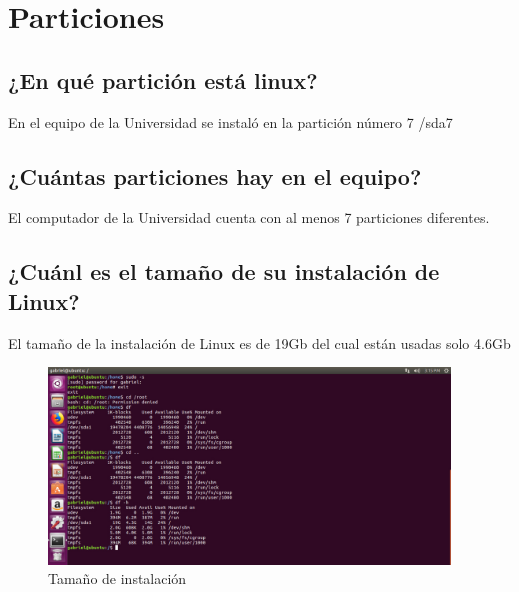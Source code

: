 \documentclass[
  letterpaper, 
  maincolor=black,
  sectioncolor=black!90,
  subsectioncolor=black!70,
  itemtextcolor=black!40,
]{fortysecondscv}
\begin{document}
\section{Particiones}
\subsection{¿En qué partición está linux?}
    En el equipo de la Universidad se instaló en la partición número 7 /sda7
\subsection{¿Cuántas particiones hay en el equipo?}
    El computador de la Universidad cuenta con al menos 7 particiones diferentes. 
\subsection{¿Cuánl es el tamaño de su instalación de Linux?}
    El tamaño de la instalación de Linux es de 19Gb del cual están usadas solo 4.6Gb
    \begin{figure}[H]
        \centering
        \includegraphics[trim= 0 40 750 420,clip,width=0.95\textwidth]{img/instalacion.jpg}
        \caption{Tamaño de instalación}
        \label{fig:my_label}
    \end{figure}
\end{document}
